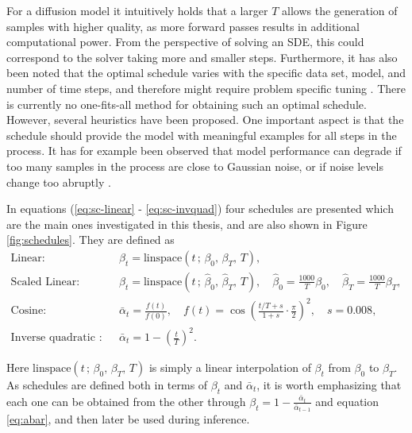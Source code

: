 \documentclass{report}
\begin{document}
For a diffusion model it intuitively holds that a larger $T$ allows the generation of samples with higher quality, as more forward passes results in additional computational power. From the perspective of solving an SDE, this could correspond to the solver taking more and smaller steps. Furthermore, it has also been noted that the optimal schedule varies with the specific data set, model, and number of time steps, and therefore might require problem specific tuning \cite{lam2022bddm, chen2020wavegrad}. There is currently no one-fits-all method for obtaining such an optimal schedule. However, several heuristics have been proposed. One important aspect is that the schedule should provide the model with meaningful examples for all steps in the process. It has for example been observed that model performance can degrade if too many samples in the process are close to Gaussian noise, or if noise levels change too abruptly \cite{nichol2021improved}. 

In equations (\ref{eq:sc-linear} - \ref{eq:sc-invquad}) four schedules are presented which are the main ones investigated in this thesis, and are also shown in Figure \ref{fig:schedules}. They are defined as
\begin{align} 
    \text{Linear}: & \quad \beta_t = \text{linspace}(t \, ; \, \beta_0, \, \beta_T, \, T), \label{eq:sc-linear} \\
    \text{Scaled Linear}: & \quad \beta_t = \text{linspace}(t \, ; \, \hat{\beta}_0, \, \hat{\beta}_T, \, T), \quad \hat{\beta}_0 = \frac{1000}{T} \beta_0, \quad \hat{\beta}_T = \frac{1000}{T}\beta_T, \label{eq:sc-scaled} \\
    \text{Cosine}: & \quad \bar{\alpha}_t = \frac{f(t)}{f(0)}, \quad f(t) = \cos\left( \frac{t/T + s}{ 1+ s}\cdot \frac{\pi}{2} \right)^2, \quad s = 0.008, \label{eq:sc-cos} \\
    \text{Inverse quadratic (IQ)}: & \quad \bar{\alpha}_t = 1 - \left(\frac{t}{T}\right)^2. \label{eq:sc-invquad}
\end{align}

Here $\text{linspace}(t \, ; \, \beta_0, \, \beta_T, \, T)$ is simply a linear interpolation of $\beta_t$ from $\beta_0$ to $\beta_T$. As schedules are defined both in terms of $\beta_t$ and $\bar{\alpha}_t$, it is worth emphasizing that each one can be obtained from the other through $\beta_t = 1 - \frac{\bar{\alpha}_t}{\bar{\alpha}_{t-1}}$ and equation \ref{eq:abar}, and then later be used during inference.
\end{document}
